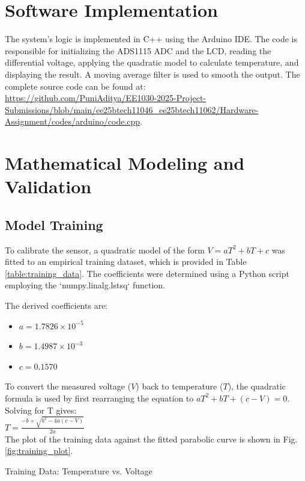 \documentclass[conference]{IEEEtran}
\begin{document}
\section{Software Implementation}
The system's logic is implemented in C++ using the Arduino IDE. The code is responsible for initializing the ADS1115 ADC and the LCD, reading the differential voltage, applying the quadratic model to calculate temperature, and displaying the result. A moving average filter is used to smooth the output. The complete source code can be found at: \\
{\url{https://github.com/PuniAditya/EE1030-2025-Project-Submissions/blob/main/ee25btech11046_ee25btech11062/Hardware-Assignment/codes/arduino/code.cpp}}.

\section{Mathematical Modeling and Validation}
\subsection{Model Training}
To calibrate the sensor, a quadratic model of the form $V = aT^2 + bT + c$ was fitted to an empirical training dataset, which is provided in Table \ref{table:training_data}. The coefficients were determined using a Python script employing the `numpy.linalg.lstsq` function.

The derived coefficients are:
\begin{itemize}
    \item $a = 1.7826 \times 10^{-5}$
    \item $b = 1.4987 \times 10^{-3}$
    \item $c = 0.1570$
\end{itemize}

To convert the measured voltage ($V$) back to temperature ($T$), the quadratic formula is used by first rearranging the equation to $aT^2 + bT + (c - V) = 0$. Solving for T gives:
\\[10pt]
$T = \frac{-b + \sqrt{b^2 - 4a(c - V)}}{2a}$
\\[10pt]

The plot of the training data against the fitted parabolic curve is shown in Fig. \ref{fig:training_plot}.

\begin{table}[!h]
  \centering
  \caption{Training Data: Temperature vs. Voltage}
  \label{table:training_data}
  
\end{table}
\end{document}
